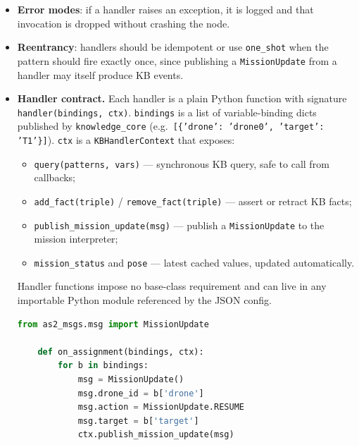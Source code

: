 \documentclass[deliverable]{csreport}
\renewcommand{\code}[1]{\texttt{\textcolor{CSMaroon}{#1}}}%
\begin{document}
\begin{itemize}
  \item \textbf{Error modes}: if a handler raises an exception, it is logged and that invocation is dropped without crashing the node.
  \item \textbf{Reentrancy}: handlers should be idempotent or use \code{one\_shot} when the pattern should fire exactly once, since publishing a \code{MissionUpdate} from a handler may itself produce KB events.

  \item \textbf{Handler contract.} Each handler is a plain Python function with signature \code{handler(bindings, ctx)}. \code{bindings} is a list of variable-binding dicts published by \code{knowledge\_core} (e.g.\ \code{[\{'drone': 'drone0', 'target': 'T1'\}]}). \code{ctx} is a \code{KBHandlerContext} that exposes:

    \begin{itemize}
      \item \code{query(patterns, vars)} --- synchronous KB query, safe to call from callbacks;
      \item \code{add\_fact(triple)} / \code{remove\_fact(triple)} --- assert or retract KB facts;
      \item \code{publish\_mission\_update(msg)} --- publish a \code{MissionUpdate} to the mission interpreter;
      \item \code{mission\_status} and \code{pose} --- latest cached values, updated automatically.
    \end{itemize}

    Handler functions impose no base-class requirement and can live in any importable Python module referenced by the JSON config.
    
    \begin{lstlisting}[language=Python, style=pycolors,caption={KB event handler function}]
    from as2_msgs.msg import MissionUpdate
    
    def on_assignment(bindings, ctx):
        for b in bindings:
            msg = MissionUpdate()
            msg.drone_id = b['drone']
            msg.action = MissionUpdate.RESUME
            msg.target = b['target']
            ctx.publish_mission_update(msg)
    \end{lstlisting}

\end{itemize}


\end{document}

